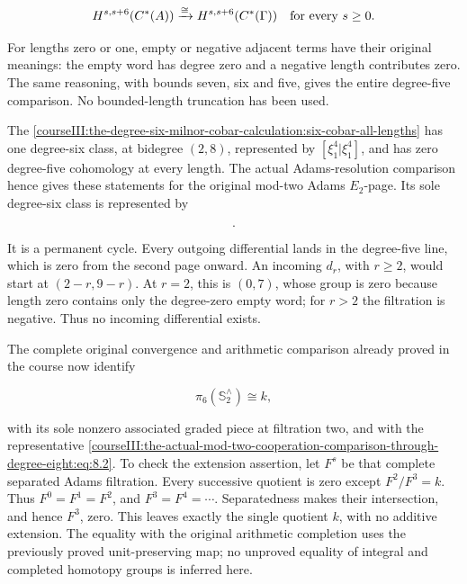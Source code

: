 \begin{equation}
H^{s,s+6}(C^*(A))\xrightarrow{\cong}
H^{s,s+6}(C^*(\Gamma))
\quad\hbox{for every }s\geq0.
\label{courseIII:the-actual-mod-two-cooperation-comparison-through-degree-eight:eq:8.1}
\end{equation}

For lengths zero or one, empty or negative adjacent terms have their original meanings: the empty word has degree zero and a negative length contributes zero. The same reasoning, with bounds seven, six and five, gives the entire degree-five comparison. No bounded-length truncation has been used.

The \cref{courseIII:the-degree-six-milnor-cobar-calculation:six-cobar-all-lengths} has one degree-six class, at bidegree \((2,8)\), represented by \([\xi_1^4|\xi_1^4]\), and has zero degree-five cohomology at every length. The actual Adams-resolution comparison hence gives these statements for the original mod-two Adams \(E_2\)-page. Its sole degree-six class is represented by

\begin{equation}
[(\xi_1^{\rm act})^4|(\xi_1^{\rm act})^4].
\label{courseIII:the-actual-mod-two-cooperation-comparison-through-degree-eight:eq:8.2}
\end{equation}

It is a permanent cycle. Every outgoing differential lands in the degree-five line, which is zero from the second page onward. An incoming \(d_r\), with \(r\geq2\), would start at \((2-r,9-r)\). At \(r=2\), this is \((0,7)\), whose group is zero because length zero contains only the degree-zero empty word; for \(r>2\) the filtration is negative. Thus no incoming differential exists.

The complete original convergence and arithmetic comparison already proved in the course now identify

\begin{equation}
\pi_6(\mathbb S^{\wedge}_2)\cong k,
\label{courseIII:the-actual-mod-two-cooperation-comparison-through-degree-eight:eq:8.3}
\end{equation}

with its sole nonzero associated graded piece at filtration two, and with the representative \eqref{courseIII:the-actual-mod-two-cooperation-comparison-through-degree-eight:eq:8.2}. To check the extension assertion, let \(F^s\) be that complete separated Adams filtration. Every successive quotient is zero except \(F^2/F^3=k\). Thus \(F^0=F^1=F^2\), and \(F^3=F^4=\cdots\). Separatedness makes their intersection, and hence \(F^3\), zero. This leaves exactly the single quotient \(k\), with no additive extension. The equality with the original arithmetic completion uses the previously proved unit-preserving map; no unproved equality of integral and completed homotopy groups is inferred here.

